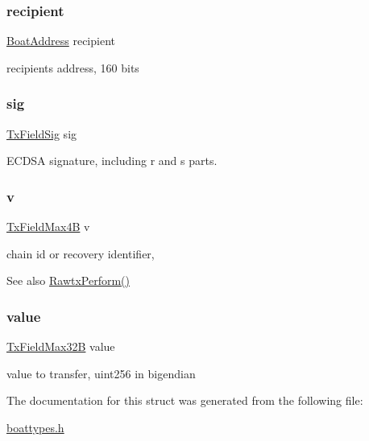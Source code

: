 \subsubsection{\texorpdfstring{recipient}{recipient}}
{\footnotesize\ttfamily \mbox{\hyperlink{boattypes_8h_a18be901fd00e05c6acdbdbab722c6c58}{Boat\+Address}} recipient}



recipient\textquotesingle{}s address, 160 bits 

\mbox{\label{struct_t_rawtx_fields_a5fe389af52b068fe72f2f4554a6b8d42}} 
\subsubsection{\texorpdfstring{sig}{sig}}
{\footnotesize\ttfamily \mbox{\hyperlink{boattypes_8h_a23685ecc8096f312ef5572783b8cb8f0}{Tx\+Field\+Sig}} sig}



E\+C\+D\+SA signature, including r and s parts. 

\mbox{\label{struct_t_rawtx_fields_a163dd89c06c387b2ef1e0c58ff588539}} 
\subsubsection{\texorpdfstring{v}{v}}
{\footnotesize\ttfamily \mbox{\hyperlink{boattypes_8h_ab7fd9a1499bdebac4af3d80e7f7e64d5}{Tx\+Field\+Max4B}} v}



chain id or recovery identifier, 

\begin{DoxySeeAlso}{See also}
\mbox{\hyperlink{rawtx_8c_a165bcf01e2d217ae91827066e28c1ccc}{Rawtx\+Perform()}} 
\end{DoxySeeAlso}
\mbox{\label{struct_t_rawtx_fields_a80bfe94443e25fd06909bad18d97cee5}} 
\subsubsection{\texorpdfstring{value}{value}}
{\footnotesize\ttfamily \mbox{\hyperlink{boattypes_8h_af8a3635bb5261915dff042bd32f3466b}{Tx\+Field\+Max32B}} value}



value to transfer, uint256 in bigendian 



The documentation for this struct was generated from the following file\+:\begin{DoxyCompactItemize}
\item 
\mbox{\hyperlink{boattypes_8h}{boattypes.\+h}}\end{DoxyCompactItemize}
